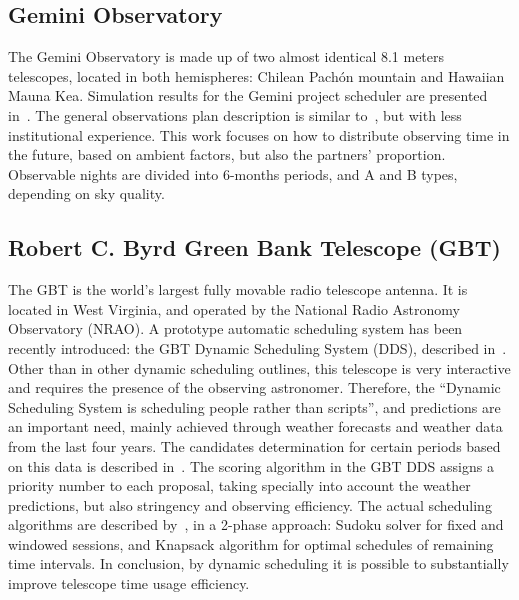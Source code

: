 \subsection{Gemini Observatory}
The Gemini Observatory is made up of two almost identical 8.1 meters telescopes, located in both hemispheres: Chilean Pach\'on mountain and Hawaiian Mauna Kea. Simulation results for the Gemini project scheduler are presented in~\cite{puxley97}. The general observations plan description is similar to~\cite{silva02}, but with less institutional experience. This work focuses on how to distribute observing time in the future, based on ambient factors, but also the partners' proportion. Observable nights are divided into 6-months periods, and A and B types, depending on sky quality.

\subsection{Robert C. Byrd Green Bank Telescope (GBT)}
The GBT is the world's largest fully movable radio telescope antenna. It is located in West Virginia, and operated by the National Radio Astronomy Observatory (NRAO). A prototype automatic scheduling system has been recently introduced: the GBT Dynamic Scheduling System (DDS), described in~\cite{Oneil09}. Other than in other dynamic scheduling outlines, this telescope is very interactive and requires the presence of the observing astronomer. Therefore, the ``Dynamic Scheduling System is scheduling people rather than scripts'', and predictions are an important need, mainly achieved through weather forecasts and weather data from the last four years. The candidates determination for certain periods based on this data is described in~\cite{balser09}. The scoring algorithm in the GBT DDS assigns a priority number to each proposal, taking specially into account the weather predictions, but also stringency and observing efficiency. The actual scheduling algorithms are described by~\cite{Sessoms09}, in a 2-phase approach: Sudoku solver for fixed and windowed sessions, and Knapsack algorithm for optimal schedules of remaining time intervals. In conclusion, by dynamic scheduling it is possible to substantially improve telescope time usage efficiency.

